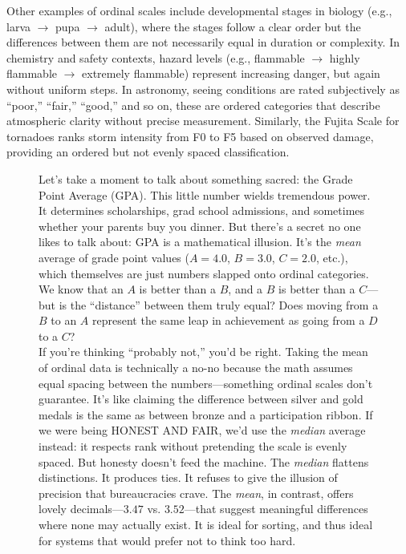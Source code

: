 Other examples of ordinal scales include developmental stages in biology (e.g., larva $\rightarrow$ pupa $\rightarrow$ adult), where the stages follow a clear order but the differences between them are not necessarily equal in duration or complexity. In chemistry and safety contexts, hazard levels (e.g., flammable $\rightarrow$ highly flammable $\rightarrow$ extremely flammable) represent increasing danger, but again without uniform steps. In astronomy, seeing conditions are rated subjectively as ``poor,'' ``fair,'' ``good,'' and so on, these are ordered categories that describe atmospheric clarity without precise measurement. Similarly, the Fujita Scale for tornadoes ranks storm intensity from F0 to F5 based on observed damage, providing an ordered but not evenly spaced classification.

\begin{figure}[htpb]
\begin{mdframed}[nobreak = true, style = miscFrame, frametitle = \Large\IMFellEnglish Box 4.1: The GPA Illusion]
\IMFellEnglish
\begin{spacing}{1.25}
Let’s take a moment to talk about something sacred: the Grade Point Average (GPA). This little number wields tremendous power. It determines scholarships, grad school admissions, and sometimes whether your parents buy you dinner. But there’s a secret no one likes to talk about: GPA is a mathematical illusion. It’s the \textit{mean} average of grade point values ($A = 4.0$, $B = 3.0$, $C = 2.0$, etc.), which themselves are just numbers slapped onto ordinal categories. We know that an $A$ is better than a $B$, and a $B$ is better than a $C$—but is the \enquote{distance} between them truly equal? Does moving from a $B$ to an $A$ represent the same leap in achievement as going from a $D$ to a $C$? \\

If you’re thinking \enquote{probably not,} you’d be right. Taking the mean of ordinal data is technically a no-no because the math assumes equal spacing between the numbers—something ordinal scales don’t guarantee. It's like claiming the difference between silver and gold medals is the same as between bronze and a participation ribbon. If we were being HONEST AND FAIR, we’d use the \textit{median} average instead: it respects rank without pretending the scale is evenly spaced. But honesty doesn’t feed the machine. The \textit{median} flattens distinctions. It produces ties. It refuses to give the illusion of precision that bureaucracies crave. The \textit{mean}, in contrast, offers lovely decimals—$3.47$ vs. $3.52$—that suggest meaningful differences where none may actually exist. It is ideal for sorting, and thus ideal for systems that would prefer not to think too hard. \\


\end{spacing}
\end{mdframed}
\end{figure}
